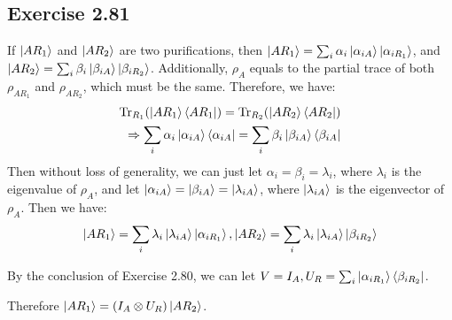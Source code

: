 \subsection*{Exercise 2.81}
If $\ket{AR_1}$ and $\ket{AR_2}$ are two purifications, then $\ket{AR_1}=\sum_i \alpha_i\ket{\alpha_{iA}}\ket{\alpha_{iR_1}}$, and $\ket{AR_2}=\sum_i \beta_i\ket{\beta_{iA}}\ket{\beta_{iR_2}}$. Additionally, $\rho_A$ equals to the partial trace of both $\rho_{AR_1}$ and $\rho_{AR_2}$, which must be the same. Therefore, we have:
\begin{align}
    {\rm Tr}_{R_1}(\ket{AR_1}\bra{AR_1})={\rm Tr}_{R_2}(\ket{AR_2}\bra{AR_2})\\
    \Rightarrow \sum_i \alpha_i\ket{\alpha_{iA}}\bra{\alpha_{iA}}=\sum_i \beta_i\ket{\beta_{iA}}\bra{\beta_{iA}}
\end{align}
Then without loss of generality, we can just let $\alpha_i=\beta_i=\lambda_i$, where $\lambda_i$ is the eigenvalue of $\rho_A$, and let $\ket{\alpha_{iA}}=\ket{\beta_{iA}}=\ket{\lambda_{iA}}$, where $\ket{\lambda_{iA}}$ is the eigenvector of $\rho_A$. Then we have:
\begin{align}
    \ket{AR_1}=\sum_i \lambda_i\ket{\lambda_{iA}}\ket{\alpha_{iR_1}},  \ket{AR_2}=\sum_i \lambda_i\ket{\lambda_{iA}}\ket{\beta_{iR_2}}
\end{align}

By the conclusion of Exercise 2.80, we can let $V=I_A, U_R=\sum_i \ket{\alpha_{iR_1}}\bra{\beta_{iR_2}}$. 

Therefore $\ket{AR_1}=(I_A\otimes U_R)\ket{AR_2}$.

